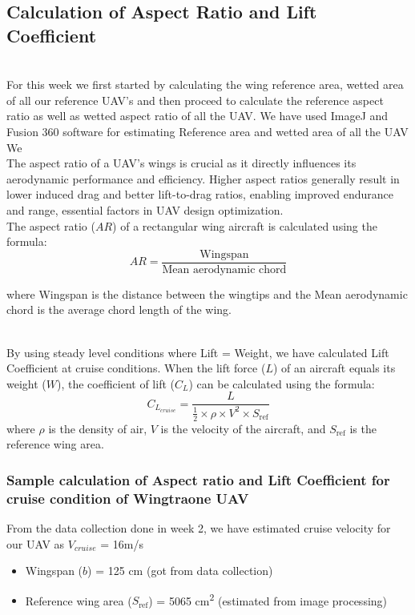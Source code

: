 \documentclass[12 pt]{article}
\begin{document}
\subsection{\large Calculation of Aspect Ratio and Lift Coefficient}
\\ For this week we first started by calculating the wing reference area, wetted area of all our reference UAV's and then proceed to calculate the reference aspect ratio as well as wetted aspect ratio of all the UAV. We have used ImageJ and Fusion 360 software for estimating Reference area and wetted area of all the UAV We \\
 The aspect ratio of a UAV's wings is crucial as it directly influences its aerodynamic performance and efficiency. Higher aspect ratios generally result in lower induced drag and better lift-to-drag ratios, enabling improved endurance and range, essential factors in UAV design optimization.
\\ The aspect ratio ($AR$) of a rectangular wing aircraft is calculated using the formula:
\[
AR = \frac{{\text{Wingspan}}}{{\text{Mean aerodynamic chord}}}\]

where Wingspan is the distance between the wingtips and the Mean aerodynamic chord is the average chord length of the wing.

\\ By using steady level conditions where Lift = Weight, we have calculated Lift Coefficient at cruise conditions.
When the lift force ($L$) of an aircraft equals its weight ($W$), the coefficient of lift ($C_L$) can be calculated using the formula:
\[
C_{L_{cruise}} = \frac{L}{\frac{1}{2} \times \rho \times V^2 \times S_{\text{ref}}}
\]
where $\rho$ is the density of air, $V$ is the velocity of the aircraft, and $S_{\text{ref}}$ is the reference wing area.
\subsubsection{Sample calculation of Aspect ratio and Lift Coefficient for cruise condition of Wingtraone UAV}
From the data collection done in week 2, we have estimated cruise velocity for our UAV as $V_{cruise}$ = 16m/s
\begin{itemize}
  \item Wingspan ($b$) = 125 cm (got from data collection)
  \item Reference wing area ($S_{\text{ref}}$) = 5065 cm\textsuperscript{2} (estimated from image processing)
\end{itemize} 
\end{document}
